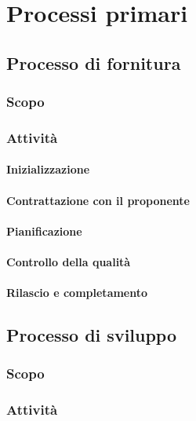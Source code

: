 \section{Processi primari}
\subsection{Processo di fornitura}

\subsubsection{Scopo}

\subsubsection{Attività}
\paragraph{Inizializzazione} 

\paragraph{Contrattazione con il proponente} 

\paragraph{Pianificazione} 

\paragraph{Controllo della qualità} 

\paragraph{Rilascio e completamento} 

\subsection{Processo di sviluppo}
\subsubsection{Scopo}

\subsubsection{Attività}
